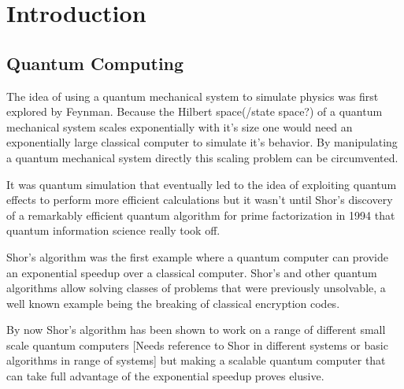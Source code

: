 \chapter{Introduction}

\section{Quantum Computing}



The idea of using a quantum mechanical system to simulate physics was first explored by Feynman\cite{Feynman1982Simulating}. Because the Hilbert space(/state space?)  of a quantum mechanical system scales  exponentially with it's size one would need an exponentially large classical computer to simulate it's behavior. By manipulating a quantum mechanical system directly this scaling problem can be circumvented.

It was quantum simulation that eventually led to the idea of exploiting quantum effects to perform more efficient calculations but it wasn't until Shor's discovery of a remarkably efficient quantum algorithm for prime factorization in 1994\citep{Shor1994Algorithms} that quantum information science really took off.

Shor's algorithm was the first example where a quantum computer can provide an exponential speedup over a classical computer. Shor's and other quantum algorithms allow solving classes of problems that were previously unsolvable, a well known example being the breaking of classical encryption codes.


By now Shor's algorithm has been shown to work on a range of different small scale quantum computers \cite{Vandersypen2001Experimental} [Needs reference to Shor in different systems or basic algorithms in range of systems] but making a scalable quantum computer that can take full advantage of the exponential speedup proves elusive.

